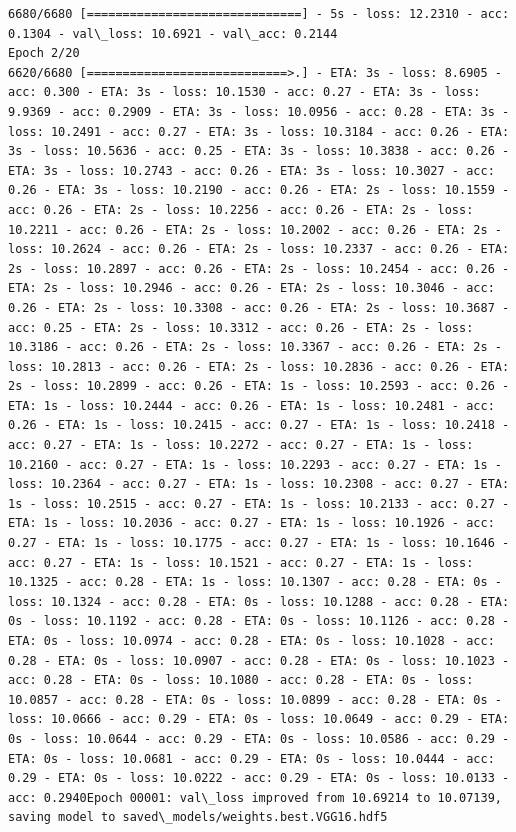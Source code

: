 \documentclass[11pt]{article}
\begin{document}
\begin{Verbatim}[commandchars=\\\{\}]
6680/6680 [==============================] - 5s - loss: 12.2310 - acc: 0.1304 - val\_loss: 10.6921 - val\_acc: 0.2144
Epoch 2/20
6620/6680 [============================>.] - ETA: 3s - loss: 8.6905 - acc: 0.300 - ETA: 3s - loss: 10.1530 - acc: 0.27 - ETA: 3s - loss: 9.9369 - acc: 0.2909 - ETA: 3s - loss: 10.0956 - acc: 0.28 - ETA: 3s - loss: 10.2491 - acc: 0.27 - ETA: 3s - loss: 10.3184 - acc: 0.26 - ETA: 3s - loss: 10.5636 - acc: 0.25 - ETA: 3s - loss: 10.3838 - acc: 0.26 - ETA: 3s - loss: 10.2743 - acc: 0.26 - ETA: 3s - loss: 10.3027 - acc: 0.26 - ETA: 3s - loss: 10.2190 - acc: 0.26 - ETA: 2s - loss: 10.1559 - acc: 0.26 - ETA: 2s - loss: 10.2256 - acc: 0.26 - ETA: 2s - loss: 10.2211 - acc: 0.26 - ETA: 2s - loss: 10.2002 - acc: 0.26 - ETA: 2s - loss: 10.2624 - acc: 0.26 - ETA: 2s - loss: 10.2337 - acc: 0.26 - ETA: 2s - loss: 10.2897 - acc: 0.26 - ETA: 2s - loss: 10.2454 - acc: 0.26 - ETA: 2s - loss: 10.2946 - acc: 0.26 - ETA: 2s - loss: 10.3046 - acc: 0.26 - ETA: 2s - loss: 10.3308 - acc: 0.26 - ETA: 2s - loss: 10.3687 - acc: 0.25 - ETA: 2s - loss: 10.3312 - acc: 0.26 - ETA: 2s - loss: 10.3186 - acc: 0.26 - ETA: 2s - loss: 10.3367 - acc: 0.26 - ETA: 2s - loss: 10.2813 - acc: 0.26 - ETA: 2s - loss: 10.2836 - acc: 0.26 - ETA: 2s - loss: 10.2899 - acc: 0.26 - ETA: 1s - loss: 10.2593 - acc: 0.26 - ETA: 1s - loss: 10.2444 - acc: 0.26 - ETA: 1s - loss: 10.2481 - acc: 0.26 - ETA: 1s - loss: 10.2415 - acc: 0.27 - ETA: 1s - loss: 10.2418 - acc: 0.27 - ETA: 1s - loss: 10.2272 - acc: 0.27 - ETA: 1s - loss: 10.2160 - acc: 0.27 - ETA: 1s - loss: 10.2293 - acc: 0.27 - ETA: 1s - loss: 10.2364 - acc: 0.27 - ETA: 1s - loss: 10.2308 - acc: 0.27 - ETA: 1s - loss: 10.2515 - acc: 0.27 - ETA: 1s - loss: 10.2133 - acc: 0.27 - ETA: 1s - loss: 10.2036 - acc: 0.27 - ETA: 1s - loss: 10.1926 - acc: 0.27 - ETA: 1s - loss: 10.1775 - acc: 0.27 - ETA: 1s - loss: 10.1646 - acc: 0.27 - ETA: 1s - loss: 10.1521 - acc: 0.27 - ETA: 1s - loss: 10.1325 - acc: 0.28 - ETA: 1s - loss: 10.1307 - acc: 0.28 - ETA: 0s - loss: 10.1324 - acc: 0.28 - ETA: 0s - loss: 10.1288 - acc: 0.28 - ETA: 0s - loss: 10.1192 - acc: 0.28 - ETA: 0s - loss: 10.1126 - acc: 0.28 - ETA: 0s - loss: 10.0974 - acc: 0.28 - ETA: 0s - loss: 10.1028 - acc: 0.28 - ETA: 0s - loss: 10.0907 - acc: 0.28 - ETA: 0s - loss: 10.1023 - acc: 0.28 - ETA: 0s - loss: 10.1080 - acc: 0.28 - ETA: 0s - loss: 10.0857 - acc: 0.28 - ETA: 0s - loss: 10.0899 - acc: 0.28 - ETA: 0s - loss: 10.0666 - acc: 0.29 - ETA: 0s - loss: 10.0649 - acc: 0.29 - ETA: 0s - loss: 10.0644 - acc: 0.29 - ETA: 0s - loss: 10.0586 - acc: 0.29 - ETA: 0s - loss: 10.0681 - acc: 0.29 - ETA: 0s - loss: 10.0444 - acc: 0.29 - ETA: 0s - loss: 10.0222 - acc: 0.29 - ETA: 0s - loss: 10.0133 - acc: 0.2940Epoch 00001: val\_loss improved from 10.69214 to 10.07139, saving model to saved\_models/weights.best.VGG16.hdf5

\end{Verbatim}
\end{document}
